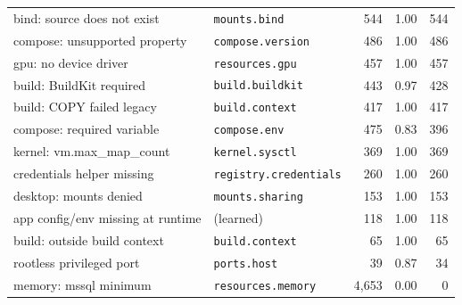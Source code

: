\begin{table}[t]
\begin{tabular}{@{}llrrr@{}}
bind: source does not exist & \texttt{mounts.bind} & 544 & 1.00 & 544 \\
compose: unsupported property & \texttt{compose.version} & 486 & 1.00 & 486 \\
gpu: no device driver & \texttt{resources.gpu} & 457 & 1.00 & 457 \\
build: BuildKit required & \texttt{build.buildkit} & 443 & 0.97 & 428 \\
build: COPY failed legacy & \texttt{build.context} & 417 & 1.00 & 417 \\
compose: required variable & \texttt{compose.env} & 475 & 0.83 & 396 \\
kernel: vm.max\_map\_count & \texttt{kernel.sysctl} & 369 & 1.00 & 369 \\
credentials helper missing & \texttt{registry.credentials} & 260 & 1.00 & 260 \\
desktop: mounts denied & \texttt{mounts.sharing} & 153 & 1.00 & 153 \\
app config/env missing at runtime & (learned) & 118 & 1.00 & 118 \\
build: outside build context & \texttt{build.context} & 65 & 1.00 & 65 \\
rootless privileged port & \texttt{ports.host} & 39 & 0.87 & 34 \\
memory: mssql minimum & \texttt{resources.memory} & 4,653 & 0.00 & 0 \\
\bottomrule
\end{tabular}
\end{table}
